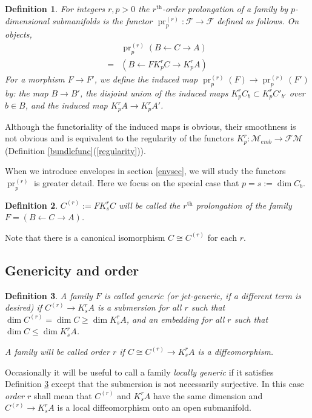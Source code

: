 \documentclass[12pt]{article}
\numberwithin{equation}{section}
\theoremstyle{plain}
\newtheorem{definition}{Definition}[section]
\theoremstyle{definition}
\newcommand{\M}{\mathcal{M}}
\newcommand{\F}{\mathcal{F}}
\newcommand{\FM}{\mathcal{FM}}
\newcommand{\la}{\leftarrow}
\newcommand{\ra}{\rightarrow}
\newcommand{\pr}{\operatorname{pr}}
\begin{document}
\begin{definition} For integers $r,p>0$ the \emph{$r^{\text{th}}$-order prolongation of a family by $p$-dimensional submanifolds} is the functor $\pr^{(r)}_p:\F\ra\F$ defined as follows. On objects,
\begin{align*}
&\pr^{(r)}_{p}\left(B\la C  \ra A\right)  \\
=& \left( B\la FK^{r}_{p}C\ra K^{r}_{p}A \right)
\end{align*}
For a morphism $F\ra F'$, we define the induced map $\pr^{(r)}_{p}(F)\ra \pr^{(r)}_{p}(F')$ by: the map $B\ra B'$, the disjoint union of the induced maps $K^{r}_{p}C_b\subset K^{r}_{p}C'_{b'}$ over $b\in B$, and the induced map $K^{r}_{p}A\ra K^{r}_{p}A'$.
\end{definition}

Although the functoriality of the induced maps is obvious, their smoothness is not obvious and is equivalent to the regularity of the functors $K^{r}_{p}:\M_{emb}\ra \FM$ (Definition \ref{bundlefunc}(\ref{regularity})).

When we introduce envelopes in section \ref{envsec}, we will study the functors $\pr^{(r)}_{p}$ is greater detail. Here we focus on the special case that $p=s:=\dim C_b$.
\begin{definition}
$C^{(r)}:=FK^{r}_{s}C$ will be called the \emph{$r^{\text{th}}$ prolongation} of the family $F=(B\la C\ra A)$.
\end{definition}
Note that there is a canonical isomorphism $C\cong C^{(r)}$ for each $r$.

\subsection{Genericity and order}\label{gensec}
\begin{definition}\label{genericf}
A family $F$ is called \emph{generic} (or \emph{jet-generic}, if a different term is desired) if $C^{(r)}\ra K^{r}_{s}A$ is a submersion for all $r$ such that $\dim C^{(r)}=\dim C \geq \dim K^{r}_{s}A$, and an embedding for all $r$ such that $\dim C \leq \dim K^{r}_{s}A$.

A family will be called \emph{order $r$} if $C\cong C^{(r)}\ra K^{r}_{s}A$ is a diffeomorphism.
\end{definition}

Occasionally it will be useful to call a family \emph{locally generic} if it satisfies Definition \ref{genericf} except that the submersion is not necessarily surjective. In this case \emph{order $r$} shall mean that $C^{(r)}$ and $K^{r}_{s}A$ have the same dimension and $C^{(r)}\ra K^{r}_{s}A$ is a local diffeomorphism onto an open submanifold.
\end{document}
